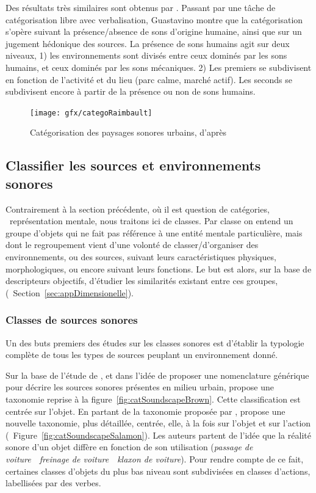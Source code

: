 Des résultats très similaires sont obtenus par \citep{guastavino2007categorization}. Passant par une tâche de catégorisation libre avec verbalisation, Guastavino montre que la catégorisation s'opère suivant la présence/absence de sons d'origine humaine, ainsi que sur un jugement hédonique des sources. La présence de sons humains agit sur deux niveaux, 1) les environnements sont divisés entre ceux dominés par les sons humains, et ceux dominés par les sons mécaniques. 2) Les premiers se subdivisent en fonction de l'activité et du lieu (parc calme, marché actif). Les seconds se subdivisent encore à partir de la présence ou non de sons humains.

\begin{figure}[t]
        \myfloatalign
        \texttt{[image: gfx/categoRaimbault]}
        \caption{Catégorisation des paysages sonores urbains, d'après \citep{raimbault2005urban}}\label{fig:catSoundscapeRaimbault}
\end{figure}

\subsection{Classifier les sources et environnements sonores}

Contrairement à la section précédente, où il est question de catégories, \ie~représentation mentale, nous traitons ici de classes. Par classe on entend un groupe d'objets qui ne fait pas référence à une entité mentale particulière, mais dont le regroupement vient d'une volonté de classer/d'organiser des environnements, ou des sources, suivant leurs caractéristiques physiques, morphologiques, ou encore suivant leurs fonctions. Le but est alors, sur la base de descripteurs objectifs, d'étudier les similarités existant entre ces groupes, (\cf~Section~\ref{sec:appDimensionelle}).


\subsubsection{Classes de sources sonores}

Un des buts premiers des études sur les classes sonores est d'établir la typologie complète de tous les types de sources peuplant un environnement donné.

Sur la base de l'étude de \citep{raimbault2005urban}, et dans l'idée de proposer une nomenclature générique pour décrire les sources sonores présentes en milieu urbain, \citep{brown2011towards} propose une taxonomie reprise à la figure~\ref{fig:catSoundscapeBrown}. Cette classification est centrée sur l'objet. En partant de la taxonomie proposée par \citep{brown2011towards}, \citep{Salamon14} propose une nouvelle taxonomie, plus détaillée, centrée, elle, à la fois sur l'objet et sur l'action (\cf~Figure~\ref{fig:catSoundscapeSalamon}). Les auteurs partent de l'idée que la réalité sonore d'un objet diffère en fonction de son utilisation (\emph{passage de voiture}~\vs~\emph{freinage de voiture}~\vs~\emph{klaxon de voiture}). Pour rendre compte de ce fait,  certaines classes d'objets du plus bas niveau sont subdivisées en classes d'actions, labellisées par des verbes.

